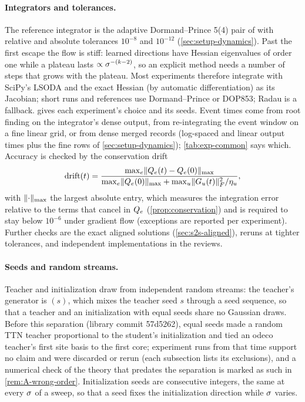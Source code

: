 \paragraph{Integrators and tolerances.}
The reference integrator is the adaptive Dormand--Prince 5(4) pair of 
with relative and absolute tolerances $10^{-8}$ and $10^{-12}$ (\cref{sec:setup-dynamics}). Past the first
escape the flow is stiff: learned directions have Hessian eigenvalues of order one while a plateau lasts
$\propto\sigma^{-(k-2)}$, so an explicit method needs a number of steps that grows with the plateau. Most
experiments therefore integrate with SciPy's LSODA and the exact Hessian (by automatic differentiation)
as its Jacobian; short runs and references use Dormand--Prince or DOP853; Radau is a fallback.
 gives each experiment's choice and its seeds. Event times come from root finding on
the integrator's dense output, from re-integrating the event window on a fine linear grid, or from dense
merged records (log-spaced and linear output times plus the fine rows of \cref{sec:setup-dynamics});
\cref{tab:exp-common} says which. Accuracy is checked by the conservation drift
\begin{equation}\label{eq:drift}
  \mathrm{drift}(t)=\frac{\max_e\lVert Q_{e}(t)-Q_{e}(0)\rVert_{\max}}
  {\max_e\lVert Q_{e}(0)\rVert_{\max}+\max_u\lVert G_{u}(t)\rVert_{F}^2/\eta_{u}},
\end{equation}
with $\lVert\cdot\rVert_{\max}$ the largest absolute entry, which measures the integration error relative to the
terms that cancel in $Q_{e}$ (\cref{prop:conservation}) and is required to stay below $10^{-6}$ under gradient
flow (exceptions are reported per experiment). Further checks are the exact aligned solutions
(\cref{sec:s2s-aligned}), reruns at tighter tolerances, and independent implementations in the reviews.

\paragraph{Seeds and random streams.}
Teacher and initialization draw from independent random streams: the teacher's generator is
$(s)$, which mixes the teacher seed $s$ through a seed sequence, so
that a teacher and an initialization with equal seeds share no Gaussian draws. Before this separation
(library commit 57d5262), equal seeds made a random TTN teacher proportional to the student's
initialization and tied an odeco teacher's first site basis to the first core; experiment runs from
that time support no claim and were discarded or rerun (each subsection lists its exclusions), and a
numerical check of the theory that predates the separation is marked as such in \cref{rem:A-wrong-order}.
Initialization seeds are consecutive integers, the same at every
$\sigma$ of a sweep, so that a seed fixes the initialization direction while $\sigma$ varies.

